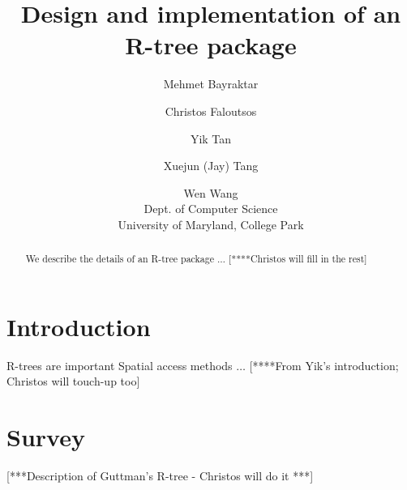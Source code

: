 
\setlength{\textheight}{8.75in}
\setlength{\textwidth}{6.8in}
\setlength{\footheight}{0.0in}
\setlength{\topmargin}{0.25in}
\setlength{\headheight}{0.0in}
\setlength{\headsep}{0.0in}
\setlength{\oddsidemargin}{-.19in}
\setlength{\parindent}{1pc}
\renewcommand{\baselinestretch}{1.3}



\newcommand{\beq}{\begin{equation}}
\newcommand{\eeq}{\end{equation}}
\newcommand{\bit}{\begin{itemize}}
\newcommand{\eit}{\end{itemize}}
\newcommand{\goal}[1]{ {\noindent {$\Rightarrow$} \em {#1} } }
\newcommand{\hide}[1]{}
\newcommand{\comment}[1]{ {\footnotesize {#1} } }
\newtheorem{lemma}{Lemma}
\newtheorem{theorem}{Theorem}
\newtheorem{proof}{Proof}
\newtheorem{defn}{Definition}
\newtheorem{algo}{Algorithm}
\newtheorem{observation}{Observation}

\title{Design and implementation of an R-tree package}
\author{ Mehmet Bayraktar	\and
	 Christos Faloutsos	\and
	 Yik Tan		\and
	 Xuejun (Jay) Tang	\and
	 Wen Wang \\
	 Dept. of Computer Science \\
	 University of Maryland, College Park
	 }
\date{}



\maketitle
\begin{abstract}
We describe the details of an R-tree package $\ldots$
[****Christos will fill in the rest]
\end{abstract}

\section{Introduction}
\label{sec:intro}

R-trees are important Spatial access methods $\ldots$
[****From Yik's introduction; Christos will touch-up too]
% 

\section{Survey}
\label{sec:survey}
[***Description of Guttman's R-tree - Christos will do it ***]
% 

